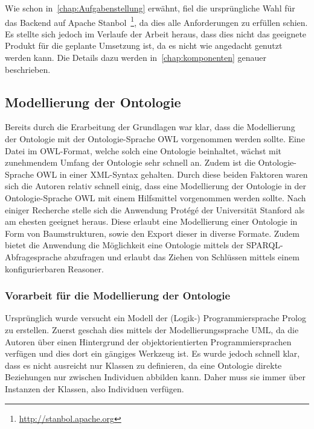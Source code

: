 Wie schon in~\autoref{chap:Aufgabenstellung} erwähnt, fiel die ursprüngliche Wahl für das Backend auf Apache Stanbol~\footnote{\url{http://stanbol.apache.org}}, da dies alle Anforderungen zu erfüllen schien. Es stellte sich jedoch im Verlaufe der Arbeit heraus, dass dies nicht das geeignete Produkt für die geplante Umsetzung ist, da es nicht wie angedacht genutzt werden kann. Die Details dazu werden in~\autoref{chap:komponenten} genauer beschrieben.

\newpage

\subsection{Modellierung der Ontologie}
\label{sub:modellierung_der_ontologie}
Bereits durch die Erarbeitung der Grundlagen war klar, dass die Modellierung der Ontologie mit der Ontologie-Sprache OWL vorgenommen werden sollte. Eine Datei im OWL-Format, welche solch eine Ontologie beinhaltet, wächst mit zunehmendem Umfang der Ontologie sehr schnell an. Zudem ist die Ontologie-Sprache OWL in einer XML-Syntax gehalten. Durch diese beiden Faktoren waren sich die Autoren relativ schnell einig, dass eine Modellierung der Ontologie in der Ontologie-Sprache OWL mit einem Hilfsmittel vorgenommen werden sollte. Nach einiger Recherche stelle sich die Anwendung Protégé der Universität Stanford als am ehesten geeignet heraus. Diese erlaubt eine Modellierung einer Ontologie in Form von Baumstrukturen, sowie den Export dieser in diverse Formate. Zudem bietet die Anwendung die Möglichkeit eine Ontologie mittels der SPARQL-Abfragesprache abzufragen und erlaubt das Ziehen von Schlüssen mittels einem konfigurierbaren Reasoner.

\subsubsection{Vorarbeit für die Modellierung der Ontologie}
\label{sub:modellierung_der_ontologie_vorarbeit}
Ursprünglich wurde versucht ein Modell der (Logik-) Programmiersprache Prolog zu erstellen. Zuerst geschah dies mittels der Modellierungssprache UML, da die Autoren über einen Hintergrund der objektorientierten Programmiersprachen verfügen und dies dort ein gängiges Werkzeug ist. Es wurde jedoch schnell klar, dass es nicht ausreicht nur Klassen zu definieren, da eine Ontologie direkte Beziehungen nur zwischen Individuen abbilden kann. Daher muss sie immer über Instanzen der Klassen, also Individuen verfügen.

